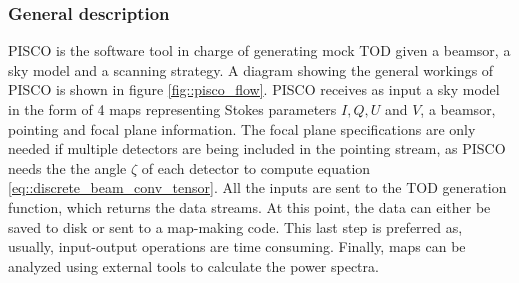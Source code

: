\documentclass[a4paper,fleqn]{cas-dc}\sloppy
\begin{document}
\subsubsection{General description}

PISCO is the software tool in charge of generating mock TOD given a beamsor, a sky model and a scanning strategy. A diagram showing the general workings of PISCO is shown in figure \ref{fig::pisco_flow}. PISCO receives as input a sky model in the form of 4 maps representing Stokes parameters $I,Q,U$ and $V$, a beamsor, pointing and focal plane information. The focal plane specifications are only needed if multiple detectors are being included in the pointing stream, as PISCO needs the the angle $\zeta$ of each detector to compute equation \ref{eq::discrete_beam_conv_tensor}. All the inputs are sent to the TOD generation function, which returns the data streams. At this point, the data can either be saved to disk or sent to a map-making code. This last step is preferred as, usually, input-output operations are time consuming. Finally, maps can be analyzed using external tools to calculate the power spectra.
\end{document}
